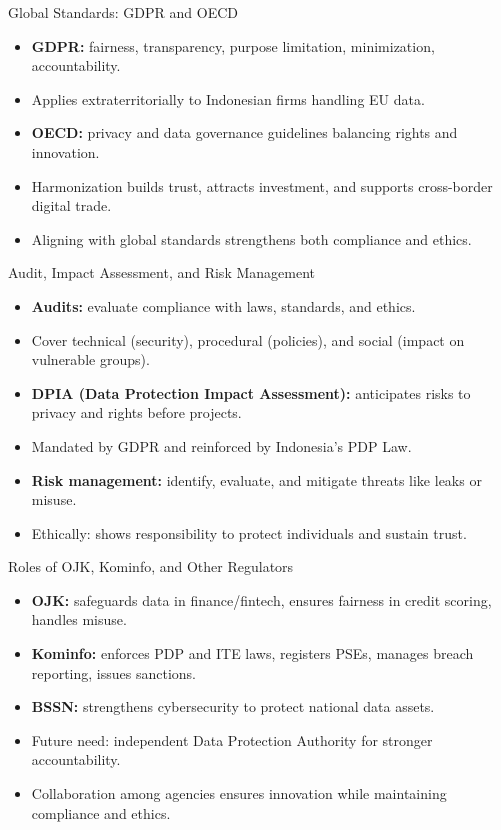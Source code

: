 \documentclass[aspectratio=169, table]{beamer}
\begin{document}
\begin{frame}{Global Standards: GDPR and OECD}
	\vspace{20pt}
	\begin{itemize}
		\item \textbf{GDPR:} fairness, transparency, purpose limitation, minimization, accountability.  
		\item Applies extraterritorially to Indonesian firms handling EU data.  
		\item \textbf{OECD:} privacy and data governance guidelines balancing rights and innovation.  
		\item Harmonization builds trust, attracts investment, and supports cross-border digital trade.  
		\item Aligning with global standards strengthens both compliance and ethics.  
	\end{itemize}
\end{frame}

\begin{frame}{\LARGE{Audit, Impact Assessment, and Risk Management}}
	\vspace{20pt}
	\begin{itemize}
		\item \textbf{Audits:} evaluate compliance with laws, standards, and ethics.  
		\item Cover technical (security), procedural (policies), and social (impact on vulnerable groups).  
		\item \textbf{DPIA (Data Protection Impact Assessment):} anticipates risks to privacy and rights before projects.  
		\item Mandated by GDPR and reinforced by Indonesia’s PDP Law.  
		\item \textbf{Risk management:} identify, evaluate, and mitigate threats like leaks or misuse.  
		\item Ethically: shows responsibility to protect individuals and sustain trust.  
	\end{itemize}
\end{frame}

\begin{frame}{Roles of OJK, Kominfo, and Other Regulators}
	\vspace{20pt}
	\begin{itemize}
		\item \textbf{OJK:} safeguards data in finance/fintech, ensures fairness in credit scoring, handles misuse.  
		\item \textbf{Kominfo:} enforces PDP and ITE laws, registers PSEs, manages breach reporting, issues sanctions.  
		\item \textbf{BSSN:} strengthens cybersecurity to protect national data assets.  
		\item Future need: independent Data Protection Authority for stronger accountability.  
		\item Collaboration among agencies ensures innovation while maintaining compliance and ethics.  
	\end{itemize}
\end{frame}
\end{document}
